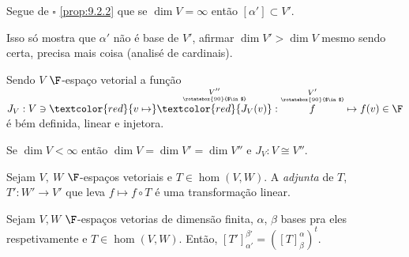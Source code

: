 \begin{corollary}
    Segue de \(\square\) \ref{prop:9.2.2} que se \(\dim V = \infty \) então \([\alpha'] \subset V'\).  
\end{corollary}

\begin{note}
    Isso só mostra que \(\alpha'\) não é base de \(V'\), afirmar \(\dim V' > \dim V\) mesmo sendo certa, precisa mais coisa (analisé de cardinais).   
\end{note}

\propositionnum{}
\begin{lemma}
    Sendo \(V\) \(\F\)-espaço vetorial a função \(J_V: V \ni \textcolor{red}{v \mapsto} \overset{\underset{\rotatebox{90}{$\in$}}{V''}}{\textcolor{red}{J_V(v)}}: \overset{\underset{\rotatebox{90}{$\in$}}{V'}}{f}\mapsto f(v) \in \F\) 
    é bém definida, linear e injetora.  
\end{lemma}


\begin{corollary}
    Se \(\dim V < \infty\) então \(\dim V = \dim V' = \dim V''\) e \(J_V: V \cong V''\). 
\end{corollary}

\begin{lemma}
    Sejam \(V, \ W\) \(\F\)-espaços vetoriais e \(T\in \hom(V,W)\). A \emph{adjunta} de \(T\), \(T': W' \to V'\) que leva \( f \mapsto f\circ T \) é uma transformação linear.  
\end{lemma}

\begin{proposition}
    \label{prop:9.2.3}
    Sejam \(V, W\) \(\F\)-espaços vetorias de dimensão finita, \(\alpha\), \(\beta \) bases pra eles respetivamente e \(T\in \hom(V,W)\). Então, \([T']^{\beta'}_{\alpha'} = ([T]^\alpha_\beta)^t\). 
\end{proposition}


